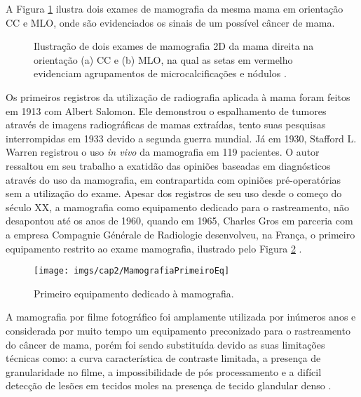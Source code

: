 A Figura \ref{fig:imgCap2ExameMamografia} ilustra dois exames de mamografia da mesma mama em orientação \ac{CC} e \ac{MLO}, onde são evidenciados os sinais de um possível câncer de mama.

\begin{figure}[H]
	\centering
	
	\caption{Ilustração de dois exames de mamografia \acs{2D} da mama direita na orientação (a) \acs{CC} e (b) \acs{MLO}, na qual as setas em vermelho evidenciam agrupamentos de microcalcificações e nódulos .}
	
	\hfil
	
	\label{fig:imgCap2ExameMamografia}
\end{figure}

Os primeiros registros da utilização de radiografia aplicada à mama foram feitos em 1913 com Albert Salomon. Ele demonstrou o espalhamento de tumores através de imagens radiográficas de mamas extraídas, tento suas pesquisas interrompidas em 1933 devido a segunda guerra mundial. Já em 1930, Stafford L. Warren registrou o uso  \textit{in vivo} da mamografia em 119 pacientes. O autor ressaltou em seu trabalho a exatidão das opiniões baseadas em diagnósticos através do uso da mamografia, em contrapartida com opiniões pré-operatórias sem a utilização do exame. Apesar dos registros de seu uso desde o começo do século XX, a mamografia como equipamento dedicado para o rastreamento, não desapontou até os anos de 1960, quando em 1965, Charles Gros em parceria com a empresa Compagnie Générale de Radiologie desenvolveu, na França, o primeiro equipamento restrito ao exame mamografia, ilustrado pelo Figura \ref{fig:imgCap2MamografiaPrimeiroEq} \cite{bassett1988evolution,gold1990highlights}. 

\begin{figure}[H]
	\caption{Primeiro equipamento dedicado à mamografia.}
	\begin{center}
		\texttt{[image: imgs/cap2/MamografiaPrimeiroEq]}
	\end{center}
	\label{fig:imgCap2MamografiaPrimeiroEq}
\end{figure}

A mamografia por filme fotográfico foi amplamente utilizada por inúmeros anos e considerada por muito tempo um equipamento preconizado para o rastreamento do câncer de mama, porém foi sendo substituída devido as suas limitações técnicas como: a curva característica de contraste limitada, a presença de granularidade no filme, a impossibilidade de pós processamento e a difícil detecção de lesões em tecidos moles na presença de tecido glandular denso \cite{karellas2008breast,lewin2001comparison}. 

